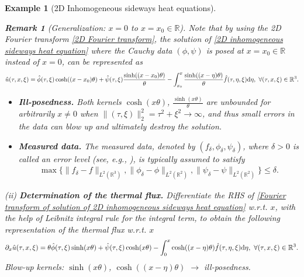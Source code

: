 \documentclass[oneside,11pt]{book}
\numberwithin{equation}{section}
\newtheorem{remark}{Remark}[section]
\newtheorem{example}{Example}[section]
\begin{document}
\begin{example}[2D Inhomogeneous sideways heat equations]
    \begin{remark}[Generalization: $x = 0$ to $x = x_0\in\mathbb{R}$]
        Note that by using the 2D Fourier transform \eqref{2D Fourier transform}, the solution of \eqref{2D inhomogeneous sideways heat equation} where the Cauchy data $(\phi,\psi)$ is posed at $x = x_0\in\mathbb{R}$ instead of $x = 0$, can be represented as
        \begin{align*}
            \hat{u}(\tau,x,\xi) = \hat{\phi}(\tau,\xi)\cosh((x - x_0)\theta) + \hat{\psi}(\tau,\xi)\frac{\sinh((x - x_0)\theta)}{\theta} - \int_{x_0}^x \frac{\sinh((x - \eta)\theta)}{\theta}\hat{f}(\tau,\eta,\xi){\rm d}\eta,\ \forall(\tau,x,\xi)\in\mathbb{R}^3.
        \end{align*}
    \end{remark}
    \begin{itemize}
        \item \textbf{Ill-posedness.} Both kernels $\cosh(x\theta)$, $\frac{\sinh(x\theta)}{\theta}$ are unbounded for arbitrarily $x\ne 0$ when $\|(\tau,\xi)\|_2^2 = \tau^2 + \xi^2\to\infty$, and thus small errors in the data can blow up and ultimately destroy the solution.
        \item \textbf{Measured data.} The measured data, denoted by $(f_\delta,\phi_\delta,\psi_\delta)$, where $\delta > 0$ is called an \emph{error level} (see, e.g., \cite{Ito_Jin2015, Kirsch2021}), is typically assumed to satisfy
        \begin{align}
            \label{noise boundedness}
            \tag{noise}
            \max\{\|f_\delta - f\|_{L^2(\mathbb{R}^3)},\|\phi_\delta - \phi\|_{L^2(\mathbb{R}^2)},\|\psi_\delta - \psi\|_{L^2(\mathbb{R}^2)}\}\le\delta.
        \end{align}
    \end{itemize}
    (ii) \textbf{Determination of the thermal flux.} Differentiate the RHS of \eqref{Fourier transform of solution of 2D inhomogeneous sideways heat equation} w.r.t. $x$, with the help of Leibnitz integral rule for the integral term, to obtain the following representation of the thermal flux w.r.t. $x$
    \begin{align*}
        \partial_x\hat{u}(\tau,x,\xi) = \theta\hat{\phi}(\tau,\xi)\sinh(x\theta) + \hat{\psi}(\tau,\xi)\cosh(x\theta) - \int_0^x \cosh((x - \eta)\theta)\hat{f}(\tau,\eta,\xi){\rm d}\eta,\ \forall(\tau,x,\xi)\in\mathbb{R}^3.
    \end{align*}
    Blow-up kernels: $\sinh(x\theta)$, $\cosh((x - \eta)\theta)$ $\to$ ill-posedness.
    

\end{example}
\end{document}
